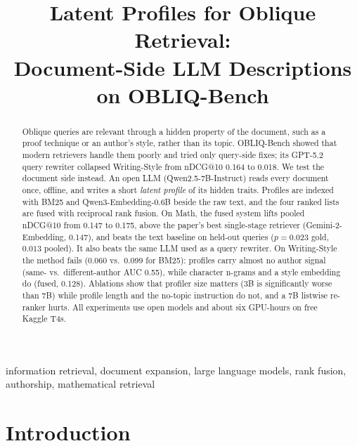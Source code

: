 \documentclass[conference]{IEEEtran}
\begin{document}
\title{Latent Profiles for Oblique Retrieval:\\Document-Side LLM Descriptions on OBLIQ-Bench}

\author{
}

\maketitle

\begin{abstract}
Oblique queries are relevant through a hidden property of the document, such as a proof technique or an author's style, rather than its topic. OBLIQ-Bench showed that modern retrievers handle them poorly and tried only query-side fixes; its GPT-5.2 query rewriter collapsed Writing-Style from nDCG@10 0.164 to 0.018. We test the document side instead. An open LLM (Qwen2.5-7B-Instruct) reads every document once, offline, and writes a short \emph{latent profile} of its hidden traits. Profiles are indexed with BM25 and Qwen3-Embedding-0.6B beside the raw text, and the four ranked lists are fused with reciprocal rank fusion. On Math, the fused system lifts pooled nDCG@10 from 0.147 to 0.175, above the paper's best single-stage retriever (Gemini-2-Embedding, 0.147), and beats the text baseline on held-out queries ($p=0.023$ gold, $0.013$ pooled). It also beats the same LLM used as a query rewriter. On Writing-Style the method fails (0.060 vs.\ 0.099 for BM25): profiles carry almost no author signal (same- vs.\ different-author AUC 0.55), while character n-grams and a style embedding do (fused, 0.128). Ablations show that profiler size matters (3B is significantly worse than 7B) while profile length and the no-topic instruction do not, and a 7B listwise re-ranker hurts. All experiments use open models and about six GPU-hours on free Kaggle T4s.
\end{abstract}

\begin{IEEEkeywords}
information retrieval, document expansion, large language models, rank fusion, authorship, mathematical retrieval
\end{IEEEkeywords}

\section{Introduction}
\end{document}
